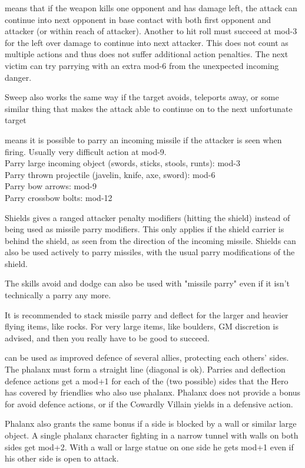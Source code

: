  means that if the weapon kills one opponent and has damage left, the attack can continue into next opponent in base contact with both first opponent and attacker (or within reach of attacker). Another to hit roll must succeed at mod-3 for the left over damage to continue into next attacker. This does not count as multiple actions and thus does not suffer additional action penalties. The next victim can try parrying with an extra mod-6 from the unexpected incoming danger.

Sweep also works the same way if the target avoids, teleports away, or some similar thing that makes the attack able to continue on to the next unfortunate target


 means it is possible to parry an incoming missile if the attacker is seen when firing. Usually very difficult action at mod-9. \\
Parry large incoming object (swords, sticks, stools, runts): mod-3 \\
Parry thrown projectile (javelin, knife, axe, sword): mod-6 \\
Parry bow arrows: mod-9 \\
Parry crossbow bolts: mod-12

Shields gives a ranged attacker penalty modifiers (hitting the shield) instead of being used as missile parry modifiers. This only applies if the shield carrier is behind the shield, as seen from the direction of the incoming missile. Shields can also be used actively to parry missiles, with the usual parry modifications of the shield.

The skills avoid and dodge can also be used with "missile parry" even if it isn't technically a parry any more.

It is recommended to stack missile parry and deflect for the larger and heavier flying items, like rocks. For very large items, like boulders, GM discretion is advised, and then you really have to be good to succeed.


 can be used as improved defence of several allies, protecting each others' sides. The phalanx must form a straight line (diagonal is ok).
Parries and deflection defence actions get a mod+1 for each of the (two possible) sides that the Hero has covered by friendlies who also use phalanx. Phalanx does not provide a bonus for avoid defence actions, or if the Cowardly Villain yields in a defensive action.

Phalanx also grants the same bonus if a side is blocked by a wall or similar large object. A single phalanx character fighting in a narrow tunnel with walls on both sides get mod+2. With a wall or large statue on one side he gets mod+1 even if his other side is open to attack.

